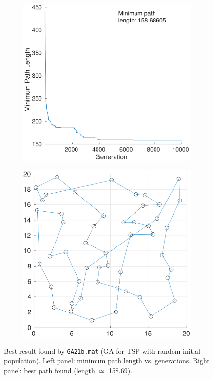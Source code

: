 \documentclass[12pt,titlepage]{article}
\begin{document}
\begin{figure}[H]
\centering
\begin{subfigure}{0.45\textwidth}
	\includegraphics[width=\textwidth]{Figures/2b_minpathLength}
	\caption{}
	\label{subfig:2b_minPathLength}
\end{subfigure} %
\hfill %
\begin{subfigure}{0.45\textwidth}
	\includegraphics[width=\textwidth]{Figures/2b_pathPlot}
	\caption{}
	\label{subfig:2b_pathPlot}
\end{subfigure} %
\caption{\footnotesize Best result found by \texttt{GA21b.mat} (GA for TSP with random initial population). Left panel: minimum path length vs. generations. Right panel: best path found (length $\simeq$ 158.69).}
\label{fig:1b}
\end{figure}
\end{document}
